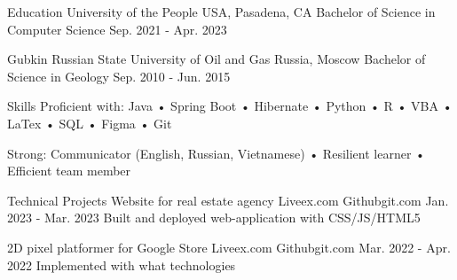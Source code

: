 



  

\begin{resumesection}{Education}
	\university
		{University of the People}
		{USA, Pasadena, CA}
		{Bachelor of Science in Computer Science}
		{Sep. 2021 - Apr. 2023}
	
	\university
		{Gubkin Russian State University of Oil and Gas}
		{Russia, Moscow}
		{Bachelor of Science in Geology}
		{Sep. 2010 - Jun. 2015}
\end{resumesection}

\begin{resumesection}{Skills}
	    {Proficient with:}
	    {Java • Spring Boot • Hibernate • Python • R • VBA • LaTex • SQL • Figma • Git}
	
	    {Strong:}
	    {Communicator (English, Russian, Vietnamese) • Resilient learner • Efficient team member}
\end{resumesection}

\begin{resumesection}{Technical Projects}
	\projectinfo
	{Website for real estate agency}
	{Live}{ex.com}
	{Github}{git.com}
	{Jan. 2023 - Mar. 2023}
	{Built and deployed web-application with CSS/JS/HTML5}	
	    
	\projectinfo
	{2D pixel platformer for Google Store}
	{Live}{ex.com}
	{Github}{git.com}
	{Mar. 2022 - Apr. 2022}
	{Implemented with what technologies}
\end{resumesection}

